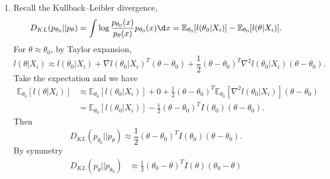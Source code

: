 \documentclass[a4paper]{article}
\begin{document}
\begin{enumerate}
\begin{minipage}{6cm}
\begin{center}
		\end{center}
	\end{minipage}
	
	\item Recall the Kullback–Leibler divergence,
	\begin{equation*}
		D_{KL}(p_{\theta_0}||p_{\theta}) = \int \log \frac{p_{\theta_0}(x)}{p_{\theta}(x)} p_{\theta_0}(x) \d x = \mathbb{E}_{\theta_0}[l(\theta_0|X_i)] - \mathbb{E}_{\theta_0}[l(\theta|X_i)].
	\end{equation*}
	For $\theta \approx \theta_0$, by Taylor expansion,
	\begin{equation*}
		l(\theta|X_i) \approx l(\theta_0|X_i) + \nabla l(\theta_0|X_i)^T(\theta - \theta_0) + \frac{1}{2}(\theta - \theta_0)^T \nabla^2 l(\theta_0|X_i)(\theta-\theta_0).
	\end{equation*}
	Take the expectation and we have
	\begin{equation*}
		\begin{aligned}
			\mathbb{E}_{\theta_0}[l(\theta|X_i)] &\approx \mathbb{E}_{\theta_0}[l(\theta_0|X_i)] + 0 + \frac{1}{2}(\theta - \theta_0)^T \mathbb{E}_{\theta_0}[\nabla^2 l(\theta_0|X_i)](\theta-\theta_0) \\
			&= \mathbb{E}_{\theta_0}[l(\theta_0|X_i)] - \frac{1}{2}(\theta - \theta_0)^T I(\theta_0)(\theta-\theta_0).
		\end{aligned}
	\end{equation*}
	Then
	\begin{equation}
		D_{KL}(p_{\theta_0}||p_{\theta}) \approx \frac{1}{2}(\theta - \theta_0)^T I(\theta_0)(\theta-\theta_0).
	\end{equation}
	By symmetry
	\begin{equation}
		\begin{aligned}
			D_{KL}(p_{\theta}||p_{\theta_0}) &\approx \frac{1}{2}(\theta_0 - \theta)^T I(\theta)(\theta_0-\theta) \\ 

\end{aligned}
\end{equation}
\end{enumerate}
\end{document}
